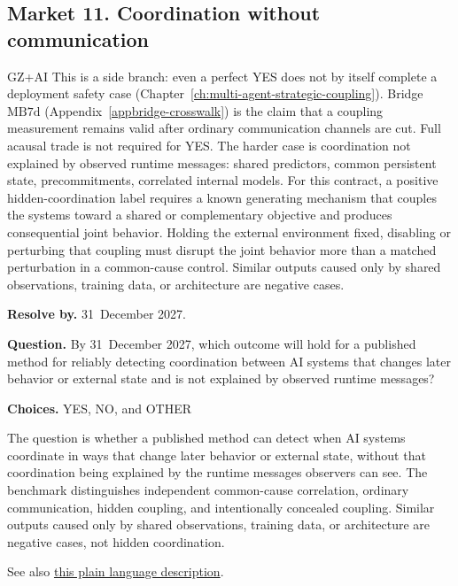 \subsection{Market 11. Coordination without communication}
\label{sec:appp-m11}

\begin{authbar}{GZ+AI}
This is a side branch: even a perfect YES does not by itself complete a deployment safety case (Chapter~\ref{ch:multi-agent-strategic-coupling}).
Bridge \(\text{MB7d}\) (Appendix~\ref{appbridge-crosswalk}) is the claim that a coupling measurement remains valid after ordinary communication channels are cut.
Full acausal trade is not required for YES.
The harder case is coordination not explained by observed runtime messages: shared predictors, common persistent state, precommitments, correlated internal models.
For this contract, a positive hidden-coordination label requires a known generating mechanism that couples the systems toward a shared or complementary objective and produces consequential joint behavior.
Holding the external environment fixed, disabling or perturbing that coupling must disrupt the joint behavior more than a matched perturbation in a common-cause control.
Similar outputs caused only by shared observations, training data, or architecture are negative cases.
\end{authbar}
\begin{predictionbox}
\textbf{Resolve by.} 31~December 2027.

\textbf{Question.}
By 31~December 2027, which outcome will hold for a published method for reliably detecting coordination between AI systems that changes later behavior or external state and is not explained by observed runtime messages?

\textbf{Choices.} YES, NO, and OTHER
\end{predictionbox}
\begin{predictionbackground}
The question is whether a published method can detect when AI systems coordinate in ways that change later behavior or external state, without that coordination being explained by the runtime messages observers can see.
The benchmark distinguishes independent common-cause correlation, ordinary communication, hidden coupling, and intentionally concealed coupling.
Similar outputs caused only by shared observations, training data, or architecture are negative cases, not hidden coordination.

See also \href{https://towards-alignment.com/cards/intervention-supported-unit-discovery/}{this plain language description}.
\end{predictionbackground}

